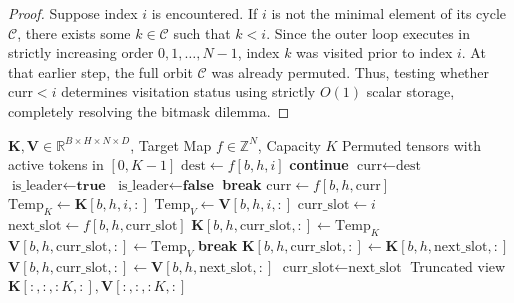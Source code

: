 \documentclass[journal,10pt,twocolumn]{article}
\begin{document}
\begin{proof}
Suppose index $i$ is encountered. If $i$ is not the minimal element of its cycle $\mathcal{C}$, there exists some $k \in \mathcal{C}$ such that $k < i$. Since the outer loop executes in strictly increasing order $0, 1, \dots, N-1$, index $k$ was visited prior to index $i$. At that earlier step, the full orbit $\mathcal{C}$ was already permuted. Thus, testing whether $\text{curr} < i$ determines visitation status using strictly $O(1)$ scalar storage, completely resolving the bitmask dilemma.
\end{proof}

\begin{algorithm}[t!]
\small
\caption{In-Place Cycle-Leader KV Compaction}
\label{alg:compact}
\begin{algorithmic}[1]
\Require $\mathbf{K}, \mathbf{V} \in \mathbb{R}^{B \times H \times N \times D}$, Target Map $f \in \mathbb{Z}^N$, Capacity $K$
\Ensure Permuted tensors with active tokens in $[0, K-1]$
            \State $\text{dest} \gets f[b, h, i]$
             
                \State \textbf{continue}
            \EndIf
            \State $\text{curr} \gets \text{dest}$
            \State $\text{is\_leader} \gets \textbf{true}$
                    \State $\text{is\_leader} \gets \textbf{false}$
                    \State \textbf{break}
                \EndIf
                \State $\text{curr} \gets f[b, h, \text{curr}]$
            \EndWhile
                \State $\text{Temp}_K \gets \mathbf{K}[b, h, i, :]$ 
                \State $\text{Temp}_V \gets \mathbf{V}[b, h, i, :]$
                \State $\text{curr\_slot} \gets i$
                    \State $\text{next\_slot} \gets f[b, h, \text{curr\_slot}]$
                        \State $\mathbf{K}[b, h, \text{curr\_slot}, :] \gets \text{Temp}_K$
                        \State $\mathbf{V}[b, h, \text{curr\_slot}, :] \gets \text{Temp}_V$
                        \State \textbf{break}
                    \Else
                        \State $\mathbf{K}[b, h, \text{curr\_slot}, :] \gets \mathbf{K}[b, h, \text{next\_slot}, :]$
                        \State $\mathbf{V}[b, h, \text{curr\_slot}, :] \gets \mathbf{V}[b, h, \text{next\_slot}, :]$
                        \State $\text{curr\_slot} \gets \text{next\_slot}$
                    \EndIf
                \EndWhile
            \EndIf
        \EndFor
    \EndFor
\EndFor
\State \Return Truncated view $\mathbf{K}[:, :, :K, :], \mathbf{V}[:, :, :K, :]$
\end{algorithmic}
\end{algorithm}
\end{document}
